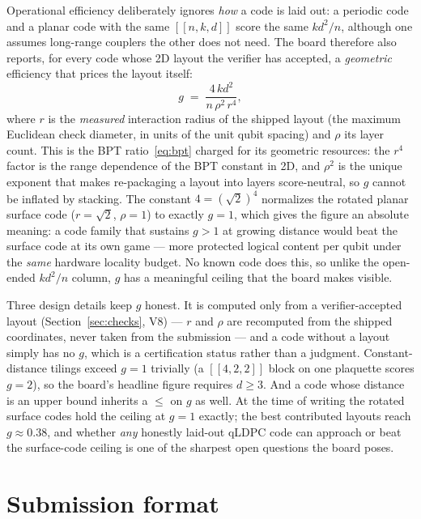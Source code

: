 \documentclass[11pt]{article}
\newcommand{\eff}{kd^2/n}
\begin{document}
	Operational efficiency deliberately ignores \emph{how} a code is laid
	out: a periodic code and a planar code with the same $[[n,k,d]]$ score
	the same $\eff$, although one assumes long-range couplers the other does
	not need. The board therefore also reports, for every code whose 2D
	layout the verifier has accepted, a \emph{geometric} efficiency that
	prices the layout itself:
	\begin{equation}
		g \;=\; \frac{4\,kd^2}{n\,\rho^2\,r^4},
		\label{eq:geff}
	\end{equation}
	where $r$ is the \emph{measured} interaction radius of the shipped
	layout (the maximum Euclidean check diameter, in units of the unit qubit
	spacing) and $\rho$ its layer count. This is the BPT
	ratio~\eqref{eq:bpt} charged for its geometric resources: the $r^4$
	factor is the range dependence of the BPT constant in 2D, and $\rho^2$
	is the unique exponent that makes re-packaging a layout into layers
	score-neutral, so $g$ cannot be inflated by stacking. The constant
	$4=(\sqrt2)^4$ normalizes the rotated planar surface code ($r=\sqrt2$,
	$\rho=1$) to exactly $g=1$, which gives the figure an absolute meaning:
	a code family that sustains $g>1$ at growing distance would beat the
	surface code at its own game --- more protected logical content per
	qubit under the \emph{same} hardware locality budget. No known code does
	this, so unlike the open-ended $\eff$ column, $g$ has a meaningful
	ceiling that the board makes visible.

	Three design details keep $g$ honest. It is computed only from a
	verifier-accepted layout (Section~\ref{sec:checks}, V8) --- $r$ and
	$\rho$ are recomputed from the shipped coordinates, never taken from the
	submission --- and a code without a layout simply has no $g$, which is a
	certification status rather than a judgment. Constant-distance tilings
	exceed $g=1$ trivially (a $[[4,2,2]]$ block on one plaquette scores
	$g=2$), so the board's headline figure requires $d\ge 3$. And a code
	whose distance is an upper bound inherits a $\le$ on $g$ as well.
	At the time of writing the rotated surface codes hold the ceiling at
	$g=1$ exactly; the best contributed layouts reach $g\approx0.38$, and
	whether \emph{any} honestly laid-out qLDPC code can approach or beat
	the surface-code ceiling is one of the sharpest open questions the
	board poses.

	\section{Submission format}
\end{document}
